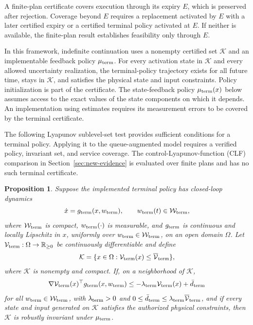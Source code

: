 \documentclass[preprint,12pt]{elsarticle}
\theoremstyle{definition}
\theoremstyle{plain}
\newtheorem{proposition}{Proposition}
\theoremstyle{definition}
\theoremstyle{plain}
\begin{document}
A finite-plan certificate covers execution through its expiry $E$, which
is preserved after rejection. Coverage beyond $E$ requires a replacement
activated by $E$ with a later certified expiry or a certified terminal policy activated at $E$. If neither is available, the finite-plan result
establishes feasibility only through $E$.

In this framework, indefinite continuation uses a nonempty certified set
$\mathcal K$ and an implementable feedback policy $\mu_{\rm term}$. For every
activation state in $\mathcal K$ and every allowed uncertainty realization,
the terminal-policy trajectory exists for all future time, stays in $\mathcal K$,
and satisfies the physical state and input constraints. Policy
initialization is part of the certificate. The state-feedback policy
$\mu_{\rm term}(x)$ below assumes access to the exact values of the state components
on which it depends. An implementation using estimates requires its
measurement errors to be covered by the terminal certificate.

The following Lyapunov sublevel-set test \cite{khalil2002nonlinear}
provides sufficient conditions for a terminal policy. Applying it to the
queue-augmented model requires a verified policy, invariant set, and
service coverage. The control-Lyapunov-function (CLF) comparison in
Section~\ref{sec:new-evidence} is evaluated over finite plans and has
no such terminal certificate.

\begin{proposition}
\label{prop:backup-lyapunov}
Suppose the implemented terminal policy has closed-loop dynamics
\[
\dot x=g_{\rm term}(x,w_{\rm term}),\qquad w_{\rm term}(t)\in\mathcal W_{\rm term},
\]
where $\mathcal W_{\rm term}$ is compact, $w_{\rm term}(\cdot)$ is measurable, and $g_{\rm term}$ is
continuous and locally Lipschitz in $x$, uniformly over
$w_{\rm term}\in\mathcal W_{\rm term}$, on an open domain $\Omega$. Let
$\mathcal V_{\rm term}:\Omega\rightarrow\mathbb R_{\ge0}$ be continuously differentiable and define
\[
\mathcal K=\{x\in\Omega:\mathcal V_{\rm term}(x)\le \overline{\mathcal V}_{\rm term}\},
\]
where $\mathcal K$ is nonempty and compact. If, on a neighborhood of
$\mathcal K$,
\[
\nabla \mathcal V_{\rm term}(x)^\top g_{\rm term}(x,w_{\rm term})
\le -\lambda_{\rm term} \mathcal V_{\rm term}(x)+\bar d_{\rm term}
\]
for all $w_{\rm term}\in\mathcal W_{\rm term}$, with
$\lambda_{\rm term}>0$ and
$0\le\bar d_{\rm term}\le\lambda_{\rm term} \overline{\mathcal V}_{\rm term}$, and if every state and input generated
on $\mathcal K$ satisfies the authorized physical constraints, then
$\mathcal K$ is robustly invariant under $\mu_{\rm term}$.
\end{proposition}
\end{document}
